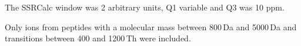The SSRCalc window was 2 arbitrary units, Q1 variable and Q3 was 10 ppm.

Only ions from peptides with a molecular mass between 800\,Da and 5000\,Da 
and transitions between 400 and 1200\,Th were included. 
%
%
%
%
%
%
%
%
%
%
%
%
%
